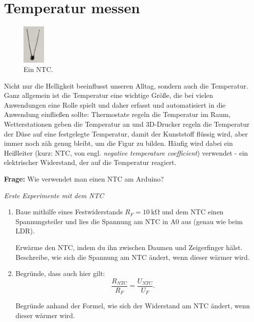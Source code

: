 	
	

\newpage
\section{Temperatur messen}
\label{sec:ntc}

\begin{figure}
	\centering
	\includegraphics[width=0.1\textwidth]{./pics/ntc.jpg}
	\caption{Ein NTC.}
\end{figure}
Nicht nur die Helligkeit beeinflusst unseren Alltag, sondern auch die Temperatur. Ganz allgemein ist die Temperatur eine wichtige Größe, die bei vielen Anwendungen eine Rolle spielt und daher erfasst und automatisiert in die Anwendung einfließen sollte: Thermostate regeln die Temperatur im Raum, Wetterstationen geben die Temperatur an und 3D-Drucker regeln die Temperatur der Düse auf eine festgelegte Temperatur, damit der Kunststoff flüssig wird, aber immer noch zäh genug bleibt, um die Figur zu bilden. Häufig wird dabei ein Heißleiter (kurz: NTC, von engl. \emph{negative temperature coefficient}) verwendet - ein elektrischer Widerstand, der auf die Temperatur reagiert.

\begin{ziel}
	\textbf{Frage:} Wie verwendet man einen NTC am Arduino?
\end{ziel}

\begin{aufgabe} \emph{Erste Experimente mit dem NTC}
	\begin{enumerate}[label=\alph*), itemsep=0ex,parsep=0ex]
		\item Baue mithilfe eines Festwiderstands $R_F=\SI{10}{\kilo\ohm}$ und dem NTC einen Spannungsteiler und lies die Spannung am NTC in A0 aus (genau wie beim LDR).
		
		Erwärme den NTC, indem du ihn zwischen Daumen und Zeigerfinger hälst. Beschreibe, wie sich die Spannung am NTC ändert, wenn dieser wärmer wird.
		\item Begründe, dass auch hier gilt:
		\begin{equation*}
			\frac{R_{NTC}}{R_{F}} = \frac{U_{NTC}}{U_{F}}.
		\end{equation*}
		
		Begründe anhand der Formel, wie sich der Widerstand am NTC ändert, wenn dieser wärmer wird.
	\end{enumerate}
\end{aufgabe}

